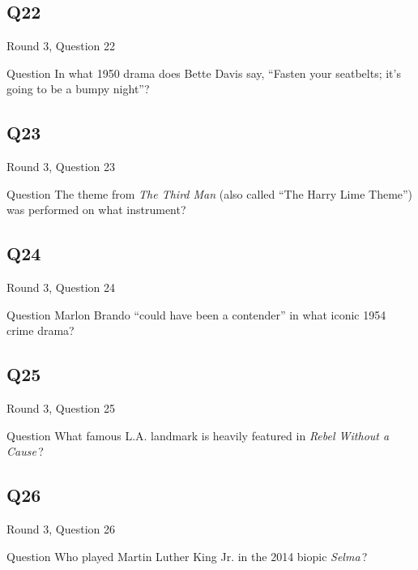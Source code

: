 \documentclass[11pt]{beamer}
\begin{document}
\subsection*{Q22}
\begin{frame}[t]{Round 3, Question 22}
\vspace{2em}
\begin{block}{Question}
In what 1950 drama does Bette Davis say, ``Fasten your seatbelts; it's going to be a bumpy night''?
\end{block}
\end{frame}
    

\subsection*{Q23}
\begin{frame}[t]{Round 3, Question 23}
\vspace{2em}
\begin{block}{Question}
The theme from \emph{The Third Man} (also called ``The Harry Lime Theme'') was performed on what instrument?
\end{block}
\end{frame}
    

\subsection*{Q24}
\begin{frame}[t]{Round 3, Question 24}
\vspace{2em}
\begin{block}{Question}
Marlon Brando ``could have been a contender'' in what iconic 1954 crime drama?
\end{block}
\end{frame}
    

\subsection*{Q25}
\begin{frame}[t]{Round 3, Question 25}
\vspace{2em}
\begin{block}{Question}
What famous L.A. landmark is heavily featured in \emph{Rebel Without a Cause}\,?
\end{block}
\end{frame}
    

\subsection*{Q26}
\begin{frame}[t]{Round 3, Question 26}
\vspace{2em}
\begin{block}{Question}
Who played Martin Luther King Jr. in the 2014 biopic \emph{Selma}\,?
\end{block}
\end{frame}
    
\end{document}

